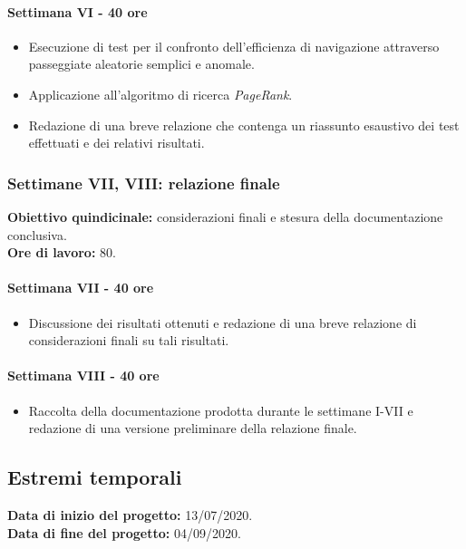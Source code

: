 {    \paragraph{Settimana VI - 40 ore} 
    
    \begin{itemize}
        \item Esecuzione di test per il confronto dell’efficienza di navigazione attraverso passeggiate aleatorie semplici e anomale.
		\item Applicazione all’algoritmo di ricerca \textit{PageRank}.
		\item Redazione di una breve relazione che contenga un riassunto esaustivo dei test effettuati e dei relativi risultati.
    \end{itemize}

    \subsubsection{Settimane VII, VIII: relazione finale} 
    \textbf{Obiettivo quindicinale:} considerazioni finali e stesura della documentazione conclusiva.
    \\
    \textbf{Ore di lavoro:} 80.
    
    \paragraph{Settimana VII - 40 ore}  
    
    \begin{itemize}
        \item Discussione dei risultati ottenuti e redazione di una breve relazione di considerazioni finali su tali risultati.
    \end{itemize}

    \paragraph{Settimana VIII - 40 ore}  
    
    \begin{itemize}
    	 \item Raccolta della documentazione prodotta durante le settimane I-VII e redazione di una versione preliminare della relazione finale.
    \end{itemize}
    
    \subsection{Estremi temporali}
    \textbf{Data di inizio del progetto:} 13/07/2020. \\
    \textbf{Data di fine del progetto:} 04/09/2020.
}

